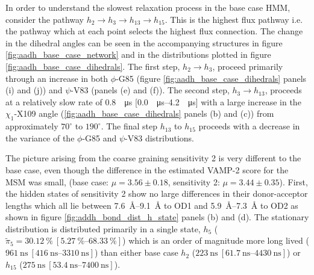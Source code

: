  In order to understand the slowest  relaxation process in the base case HMM, consider the pathway $h_{2}\rightarrow h_{3} \rightarrow h_{13} \rightarrow h_{15}$. This is the highest flux pathway i.e. the pathway which at each point selects the highest flux connection. The change in the dihedral angles can be seen in the accompanying structures in figure \ref{fig:aadh_base_case_network} and in the distributions plotted in figure \ref{fig:aadh_base_case_dihedrals}.
 The first step, $h_2 \rightarrow h_{3}$, proceed primarily through an increase in both $\phi$-G85 (figure \ref{fig:aadh_base_case_dihedrals} panels (i) and (j)) and $\psi$-V83 (panels (e) and (f)). The second step, $h_{3} \rightarrow h_{13}$, proceeds at a relatively slow rate of  \SI{0.8}{\per\micro\second} [\SIrange[range-phrase=\text{--}]{0.0}{4.2}{\per\micro\second}] with a large increase in the $\chi_1$-X109 angle (\ref{fig:aadh_base_case_dihedrals} panels (b) and (c)) from approximately $70^{\circ}$ to $190^{\circ}$. The final step $h_{13}$ to $h_{15}$ proceeds with a decrease in the variance of the $\phi$-G85 and $\psi$-V83 distributions.


The picture arising from the coarse graining sensitivity 2 is very different to the base case, even though the difference in the estimated VAMP-2 score for the MSM was small, (base case: $\mu=3.56 \pm 0.18$, sensitivity 2: $\mu=3.44 \pm 0.35$).   First, the hidden states of sensitivity 2 show no large differences in their donor-acceptor lengths which all lie between \SIrange[range-phrase=\text{--}]{7.6}{9.1}{\angstrom} to OD1 and \SIrange[range-phrase=\text{--}]{5.9}{7.3}{\angstrom} to OD2 as shown in figure \ref{fig:addh_bond_dist_h_state} panels (b) and (d). The stationary distribution is distributed primarily in a single state, $h_{5}$ ($\tilde{\pi}_{5} = \SI{30.12}{\percent}\ [\SIrange[range-phrase=\text{--}]{5.27}{68.33}{\percent}]$) which is an order of magnitude more long lived ($\SI{961}{\nano\second}\ [\SIrange[range-phrase=\text{--}]{416}{3310}{\nano\second}]$) than either base case $h_{2}$ ($\SI{223}{\nano\second}\ [\SIrange[range-phrase=\text{--}]{61.7}{4430}{\nano\second}]$) or $h_{15}$ ($\SI{275}{\nano\second}\ [\SIrange[range-phrase=\text{--}]{53.4}{7400}{\nano\second}]$). 

